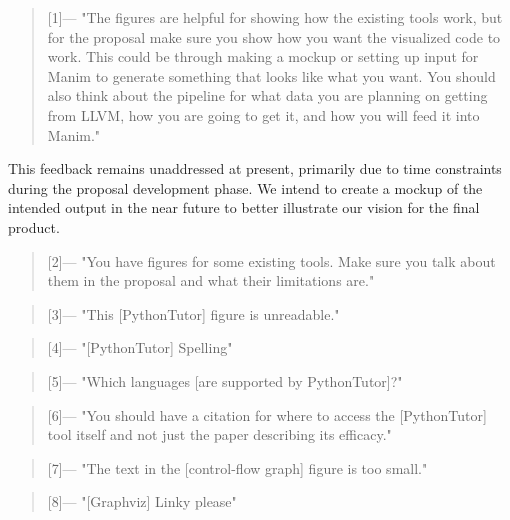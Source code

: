 \begin{quotation} [1]---%
"The figures are helpful for showing how the existing tools work, but for the
proposal make sure you show how you want the visualized code to work.  This
could be through making a mockup or setting up input for Manim to generate
something that looks like what you want.  You should also think about the
pipeline for what data you are planning on getting from LLVM, how you are going
to get it, and how you will feed it into Manim."
\end{quotation}
\noindent This feedback remains unaddressed at present, primarily due to time constraints during the proposal development phase. We intend to create a mockup of the intended output in the near future to better illustrate our vision for the final product.

\begin{quotation} [2]---%
  "You have figures for some existing tools.  Make sure you talk about them in the proposal and what their limitations are."
\end{quotation}

\noindent\hrulefill

\begin{quotation} [3]---%
  "This [PythonTutor] figure is unreadable."
\end{quotation}

\begin{quotation} [4]---%
  "[PythonTutor] Spelling"
\end{quotation}

\begin{quotation} [5]---%
  "Which languages [are supported by PythonTutor]?"
\end{quotation}

\begin{quotation} [6]---%
  "You should have a citation for where to access the [PythonTutor] tool itself and not just the paper describing its efficacy."
\end{quotation}

\begin{quotation} [7]---%
  "The text in the [control-flow graph] figure is too small."
\end{quotation}

\begin{quotation} [8]---%
  "[Graphviz] Linky please"
\end{quotation}

